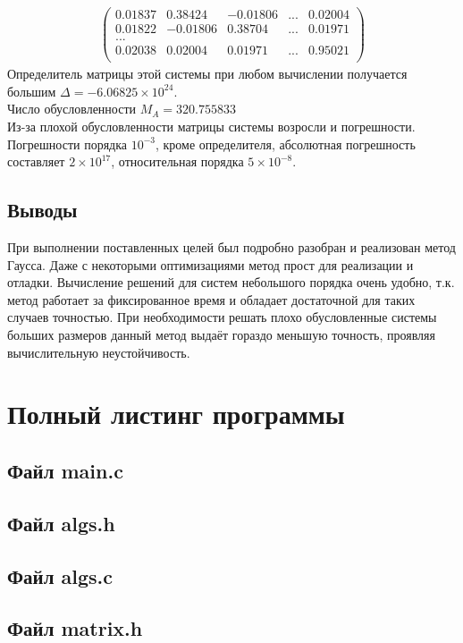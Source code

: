 \documentclass[a4paper,12pt,titlepage,finall]{article}
\begin{document}
\begin{enumerate}
\begin{align*}
\begin{pmatrix}
	0.01837&     0.38424&    -0.01806& ... &     0.02004 \\
	0.01822&    -0.01806&     0.38704& ... &     0.01971 \\
	...\\
	0.02038&     0.02004&     0.01971& ... &     0.95021 \\
\end{pmatrix}
\end{align*}
Определитель матрицы этой системы при любом вычислении получается большим $\Delta = -6.06825 \times 10^24$.\\
Число обусловленности $M_A = 320.755833$\\
Из-за плохой обусловленности матрицы системы возросли и погрешности. Погрешности порядка $10^{-3}$, кроме определителя, абсолютная погрешность составляет $2 \times 10^{17}$, относительная порядка $5 \times 10^{-8}$.
\end{enumerate}
\subsection{Выводы}
При выполнении поставленных целей был подробно разобран и реализован метод Гаусса. Даже с некоторыми оптимизациями метод прост для реализации и отладки. Вычисление решений для систем небольшого порядка очень удобно, т.к. метод работает за фиксированное время и обладает достаточной для таких случаев точностью. При необходимости решать плохо обусловленные системы больших размеров данный метод выдаёт гораздо меньшую точность, проявляя вычислительную неустойчивость.

\newpage
\section{Полный листинг программы} \label{source}

\subsection{Файл main.c}

\subsection{Файл algs.h}

\subsection{Файл algs.c}

\subsection{Файл matrix.h}

\end{document}
